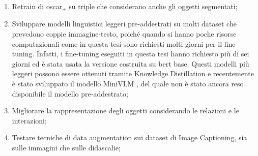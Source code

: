 \begin{enumerate}
\begin{enumerate}
    \end{enumerate}
    \item Retrain di \acrshort{oscar}$_+$ su triple che considerano anche gli oggetti segmentati;
    \item Sviluppare modelli linguistici leggeri pre-addestrati su molti dataset che prevedono coppie immagine-testo, poiché quando si hanno poche risorse computazionali come in questa tesi sono richiesti molti giorni per il fine-tuning. Infatti, i fine-tuning eseguiti in questa tesi hanno richiesto più di sei giorni ed è stata usata la versione costruita su \acrshort{bert} base. Questi modelli più leggeri possono essere ottenuti tramite Knowledge Distillation \cite{fang2021compressing} e recentemente è stato sviluppato il modello MiniVLM \cite{wang2020minivlm}, del quale non è stato ancora reso disponibile il modello pre-addestrato;
    \item Migliorare la rappresentazione degli oggetti considerando le relazioni e le interazioni;
    \item Testare tecniche di data augmentation sui dataset di Image Captioning, sia sulle immagini che sulle didascalie;
\end{enumerate}